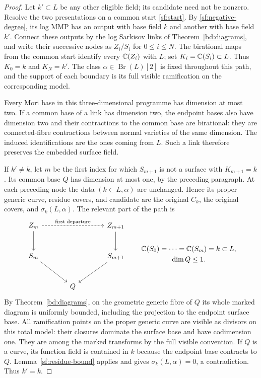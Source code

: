 \begin{proof}
Let $k'\subset L$ be any other eligible field; its candidate need not
be nonzero.  Resolve the two presentations on a common start
\eqref{sf:start}.  By \eqref{sf:negative-degree}, its log MMP has an
output with base field $k$ and another with base field $k'$.  Connect
these outputs by the log Sarkisov links of
Theorem~\ref{bd:diagrams}, and write their successive nodes as
$Z_i/S_i$ for $0\leq i\leq N$.  The birational maps from the common
start identify every $\mathbb C(Z_i)$ with $L$; set $K_i=\mathbb C(S_i)\subset L$.
Thus $K_0=k$ and $K_N=k'$.  The class $\alpha\in\operatorname{Br}(L)[2]$
is fixed throughout this path, and the support of each boundary is its
full visible ramification on the corresponding model.

Every Mori base in this three-dimensional programme has dimension at
most two.  If a common base of a link has dimension two, the endpoint
bases also have dimension two and their contractions to the common
base are birational: they are connected-fibre contractions between
normal varieties of the same dimension.  The induced identifications
are the ones coming from $L$.  Such a link therefore preserves the
embedded surface field.

If $k'\ne k$, let $m$ be the first index for which $S_{m+1}$ is not
a surface with $K_{m+1}=k$.  Its common base $Q$ has dimension at most
one, by the preceding paragraph.  At each preceding node the data
$(k\subset L,\alpha)$ are unchanged.  Hence its proper generic curve,
residue covers, and candidate are the original $C_k$, the original
covers, and $\sigma_k(L,\alpha)$.  The relevant part of the path is
\[
\begin{tikzcd}[column sep=large,row sep=large]
 Z_m \arrow[rr,dashed,"\text{first departure}"] \arrow[d]
   && Z_{m+1}\arrow[d] \\
 S_m\arrow[dr] && S_{m+1}\arrow[dl] \\
 & Q
\end{tikzcd}
\qquad
\begin{gathered}
 \C(S_0)=\cdots=\C(S_m)=k\subset L,\\
 \dim Q\leq1.
\end{gathered}
\]
By Theorem~\ref{bd:diagrams}, on the
geometric generic fibre of $Q$ its whole marked diagram is uniformly
bounded, including the projection to the endpoint surface base.
All ramification points on the proper generic curve are visible as
divisors on this total model: their closures dominate the surface
base and have codimension one.  They are among the marked transforms
by the full visible convention.  If $Q$ is a curve, its function
field is contained in $k$ because the endpoint base contracts to
$Q$.  Lemma~\ref{sf:residue-bound} applies and gives
$\sigma_k(L,\alpha)=0$, a contradiction.  Thus $k'=k$.
\end{proof}

